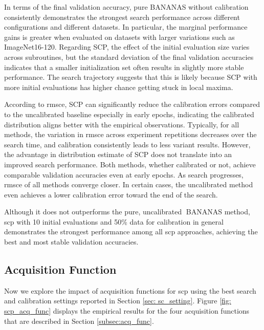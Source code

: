 \documentclass[a4paper,oneside,bibliography=totoc]{scrbook}
\begin{document}
In terms of the final validation accuracy, pure BANANAS without calibration consistently demonstrates the strongest search performance across different configurations and different datasets. In particular, the marginal performance gains is greater when evaluated on datasets with larger variations such as ImageNet16-120. Regarding  SCP, the effect of the initial evaluation size varies across subroutines, but the standard deviation of the final validation accuracies indicates that a smaller initialization set often results in slightly more stable performance. The search trajectory suggests that this is likely because SCP with more initial evaluations has higher chance getting stuck in local maxima. 

According to \gls{rmsce}, SCP can significantly reduce the calibration errors compared to the uncalibrated baseline especially in early epochs, indicating the calibrated distribution aligns better with the empirical observations. Typically, for all methods, the variation in \gls{rmsce} across experiment repetitions decreases over the search time, and calibration consistently leads to less variant results. However, the advantage in distribution estimate of SCP does not translate into an improved search performance. Both methods, whether calibrated or not, achieve comparable validation accuracies even at early epochs.  As search progresses, \gls{rmsce} of all methods converge closer.  In certain cases, the uncalibrated method even achieves a lower calibration error toward the end of the search.

Although it does not outperforms the pure, uncalibrated BANANAS method, \gls{scp} with 10 initial evaluations and 50\% data for calibration in general demonstrates the strongest performance among all \gls{scp} approaches, achieving the best and most stable validation accuracies.

\subsection{Acquisition Function}
Now we explore the impact of acquisition functions for \gls{scp} using the best search and calibration settings reported in Section \ref{sec: sc_setting}. Figure \ref{fig: scp_acq_func} displays the empirical results for the four acquisition functions that are described in Section \ref{subsec:acq_func}. 

\vspace{0.5em}
\end{document}
